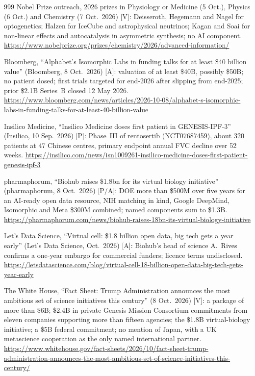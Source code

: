 \begin{thebibliography}{999}
 Nobel Prize outreach, 2026 prizes in Physiology or Medicine (5 Oct.), Physics (6 Oct.) and Chemistry (7 Oct.\ 2026) [V]: Deisseroth, Hegemann and Nagel for optogenetics; Halzen for IceCube and astrophysical neutrinos; Kagan and Soai for non-linear effects and autocatalysis in asymmetric synthesis; no AI component. \url{https://www.nobelprize.org/prizes/chemistry/2026/advanced-information/}

 Bloomberg, ``Alphabet's Isomorphic Labs in funding talks for at least \$40 billion value'' (Bloomberg, 8 Oct.\ 2026) [A]: valuation of at least \$40B, possibly \$50B; no patient dosed; first trials targeted for end-2026 after slipping from end-2025; prior \$2.1B Series~B closed 12 May 2026. \url{https://www.bloomberg.com/news/articles/2026-10-08/alphabet-s-isomorphic-labs-in-funding-talks-for-at-least-40-billion-value}

 Insilico Medicine, ``Insilico Medicine doses first patient in GENESIS-IPF-3'' (Insilico, 10 Sep.\ 2026) [P]: Phase~III of rentosertib (NCT07687459), about 320 patients at 47 Chinese centres, primary endpoint annual FVC decline over 52 weeks. \url{https://insilico.com/news/isn1009261-insilico-medicine-doses-first-patient-genesis-ipf-3}

 pharmaphorum, ``Biohub raises \$1.8bn for its virtual biology initiative'' (pharmaphorum, 8 Oct.\ 2026) [P/A]: DOE more than \$500M over five years for an AI-ready open data resource, NIH matching in kind, Google DeepMind, Isomorphic and Meta \$300M combined; named components sum to \$1.3B. \url{https://pharmaphorum.com/news/biohub-raises-18bn-its-virtual-biology-initiative}

 Let's Data Science, ``Virtual cell: \$1.8 billion open data, big tech gets a year early'' (Let's Data Science, Oct.\ 2026) [A]: Biohub's head of science A.~Rives confirms a one-year embargo for commercial funders; licence terms undisclosed. \url{https://letsdatascience.com/blog/virtual-cell-18-billion-open-data-big-tech-gets-year-early}

 The White House, ``Fact Sheet: Trump Administration announces the most ambitious set of science initiatives this century'' (8 Oct.\ 2026) [V]: a package of more than \$6B; \$2.4B in private Genesis Mission Consortium commitments from eleven companies supporting more than fifteen agencies; the \$1.8B virtual-biology initiative; a \$5B federal commitment; no mention of Japan, with a UK metascience cooperation as the only named international partner. \url{https://www.whitehouse.gov/fact-sheets/2026/10/fact-sheet-trump-administration-announces-the-most-ambitious-set-of-science-initiatives-this-century/}


\end{thebibliography}
